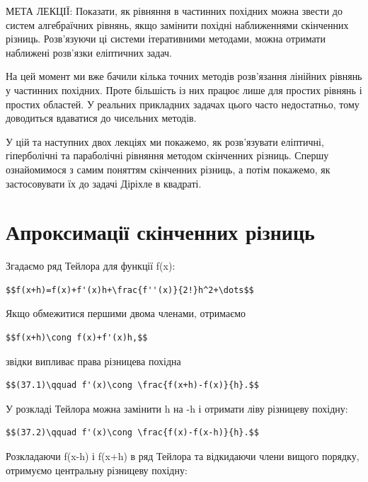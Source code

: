 \documentclass[
  ukrainian,
]{article}
\begin{document}
МЕТА ЛЕКЦІЇ: Показати, як рівняння в частинних похідних можна звести до
систем алгебраїчних рівнянь, якщо замінити похідні наближеннями
скінченних різниць. Розв'язуючи ці системи ітеративними методами, можна
отримати наближені розв'язки еліптичних задач.

На цей момент ми вже бачили кілька точних методів розв'язання лінійних
рівнянь у частинних похідних. Проте більшість із них працює лише для
простих рівнянь і простих областей. У реальних прикладних задачах цього
часто недостатньо, тому доводиться вдаватися до чисельних методів.

У цій та наступних двох лекціях ми покажемо, як розв'язувати еліптичні,
гіперболічні та параболічні рівняння методом скінченних різниць. Спершу
ознайомимося з самим поняттям скінченних різниць, а потім покажемо, як
застосовувати їх до задачі Діріхле в квадраті.

\section{Апроксимації скінченних
різниць}\label{ux430ux43fux440ux43eux43aux441ux438ux43cux430ux446ux456ux457-ux441ux43aux456ux43dux447ux435ux43dux43dux438ux445-ux440ux456ux437ux43dux438ux446ux44c}

Згадаємо ряд Тейлора для функції f(x):

\begin{verbatim}
$$f(x+h)=f(x)+f'(x)h+\frac{f''(x)}{2!}h^2+\dots$$
\end{verbatim}

Якщо обмежитися першими двома членами, отримаємо

\begin{verbatim}
$$f(x+h)\cong f(x)+f'(x)h,$$
\end{verbatim}

звідки випливає права різницева похідна

\begin{verbatim}
$$(37.1)\qquad f'(x)\cong \frac{f(x+h)-f(x)}{h}.$$
\end{verbatim}

У розкладі Тейлора можна замінити h на -h і отримати ліву різницеву
похідну:

\begin{verbatim}
$$(37.2)\qquad f'(x)\cong \frac{f(x)-f(x-h)}{h}.$$
\end{verbatim}

Розкладаючи f(x-h) і f(x+h) в ряд Тейлора та відкидаючи члени вищого
порядку, отримуємо центральну різницеву похідну:
\end{document}
